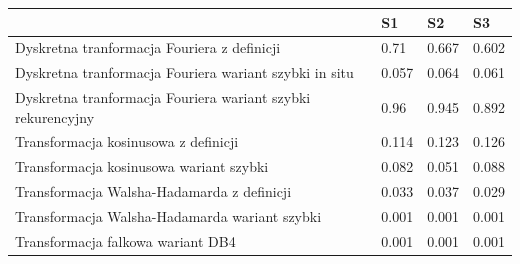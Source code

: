 \documentclass[12pt]{article}
\begin{document}
{{            \begin{table}[H]
                \begin{tabular}{|l|l|l|l|}
                    \hline
                                                                                & S1        & S2     & S3        \\ \hline
                    Dyskretna tranformacja Fouriera z definicji                 & 0.71      & 0.667  & 0.602     \\ \hline
                    Dyskretna tranformacja Fouriera wariant szybki in situ      & 0.057     & 0.064  & 0.061     \\ \hline
                    Dyskretna tranformacja Fouriera wariant szybki rekurencyjny & 0.96      & 0.945  & 0.892     \\ \hline
                    Transformacja kosinusowa z definicji                        & 0.114     & 0.123  & 0.126     \\ \hline
                    Transformacja kosinusowa wariant szybki                     & 0.082     & 0.051  & 0.088     \\ \hline
                    Transformacja Walsha-Hadamarda z definicji                  & 0.033     & 0.037  & 0.029     \\ \hline
                    Transformacja Walsha-Hadamarda wariant szybki               & 0.001     & 0.001  & 0.001     \\ \hline
                    Transformacja falkowa wariant DB4                           & 0.001     & 0.001  & 0.001     \\ \hline
                \end{tabular}
            \end{table}
        }
        \newpage
    }
\end{document}
